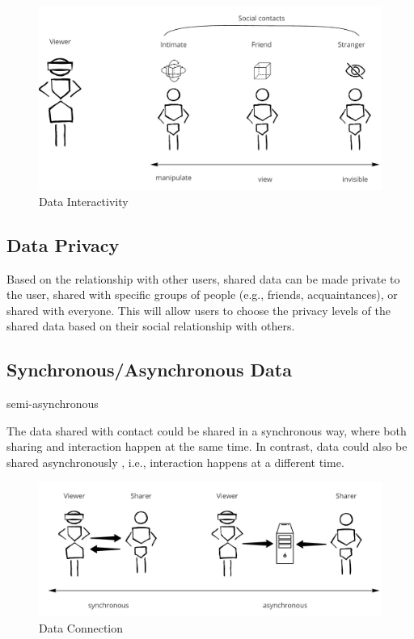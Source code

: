 \begin{figure}[h]
    \centering
    \includegraphics[width=.8\linewidth]{images/Continuum-interaction.jpg}
    \caption{Data Interactivity}
    \label{fig:continuum:data-interaction}
\end{figure}

\subsection{Data Privacy}
Based on the relationship with other users, shared data can be made private to the user, shared with specific groups of people (e.g., friends, acquaintances), or shared with everyone. This will allow users to choose the privacy levels of the shared data based on their social relationship with others. 

\subsection{Synchronous/Asynchronous Data}

semi-asynchronous

The data shared with contact could be shared in a synchronous way, where both sharing and interaction happen at the same time. In contrast, data could also be shared asynchronously \cite{Smith2016}, i.e., interaction happens at a different time. 

\begin{figure}[h]
    \centering
    \includegraphics[width=.8\linewidth]{images/continuum-connection.jpg}
    \caption{Data Connection}
    \label{fig:continuum:data-connection}
\end{figure}

